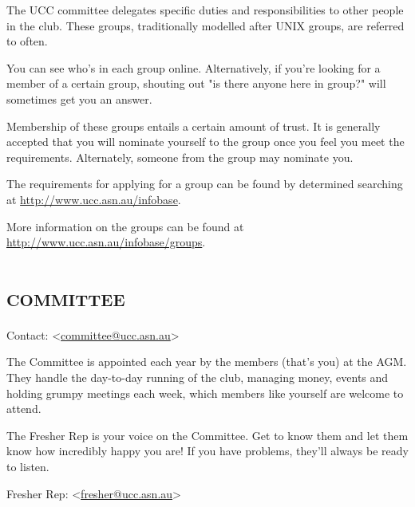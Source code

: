 
\newenvironment{uccgroup}[1]
{
\begin{minipage}{\textwidth}
	\section{\textsc{#1}}
	Contact: <\href{mailto:#1@ucc.asn.au}{#1@ucc.asn.au}>
	
	
}{
\end{minipage}
}

\null
The UCC committee delegates specific duties and responsibilities to other people in the club. These groups, traditionally modelled after UNIX groups, are referred to often.

You can see who's in each group online. Alternatively, if you're looking for a member of a certain group, shouting out "is there anyone here in group?" will sometimes get you an answer.


Membership of these groups entails a certain amount of trust. It is generally accepted that you will nominate yourself to the group once you feel you meet the requirements. Alternately, someone from the group may nominate you.

The requirements for applying for a group can be found by determined searching at \url{http://www.ucc.asn.au/infobase}.

More information on the groups can be found at \url{http://www.ucc.asn.au/infobase/groups}.




\begin{uccgroup}{committee}
The Committee is appointed each year by the members (that's you) at the AGM. They handle the day-to-day running of the club, managing money, events and holding grumpy meetings each week, which members like yourself are welcome to attend.


The Fresher Rep is your voice on the Committee. Get to know them and let them know how incredibly happy you are! If you have problems, they'll always be ready to listen.

Fresher Rep: <\href{mailto:fresher@ucc.asn.au}{fresher@ucc.asn.au}>
\end{uccgroup}

